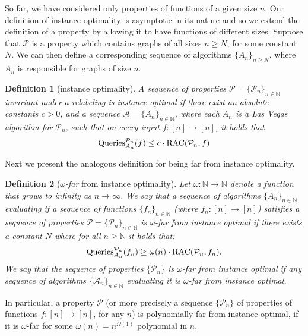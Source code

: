 \documentclass[11pt]{article}
\numberwithin{equation}{section}
\newtheorem{definition}[definition]{Definition}
\newcommand{\Query}{\text{Queries}}
\newcommand{\N}{\mathbb N}
\renewcommand{\P}{\mathcal{P}}
\newcommand{\1}{\mathbf{1}}
\newcommand{\A}{\mathcal A}
\begin{document}
So far, we have considered only properties of functions of a given size $n$. Our definition of instance optimality is asymptotic in its nature and so we extend the definition of a property by allowing it to have functions of different sizes. Suppose that  $\mathcal{P}$ is a property which contains graphs of all sizes $n \geq N$, for some constant $N$. 
We can then define a corresponding sequence of algorithms $\{A_n\}_{n \geq N}$, where $A_n$ is responsible for graphs of size $n$.
\begin{definition}[instance optimality]
  A sequence of properties $\P=\{\P_n\}_{n\in \N}$ invariant under a relabeling is \emph{instance optimal} if there exist an absolute constants $c > 0$,
  and a sequence
  $\A = \{A_n\}_{n\in \N}$, where each $A_n$ is a Las Vegas algorithm for $\mathcal{P}_n$, such that on every input $f \colon [n] \to [n]$, it holds that
  \begin{align*}
    \Query^{\P_n}_{A_n}(f) \leq c \cdot \RACC(\mathcal{P}_n,f)
  \end{align*}
\end{definition}
\iffalse
\begin{definition}[Instance Optimality]
 We say that a sequence of algorithms $\{A\}_{n \in \N}$ evaluating if a sequence of function $\{f\}_{n \in \N}$ satisfies a property $P$ is \emph{Instance Optimal} if there exists a universal constant, $c$, such that for any function $f$, it holds that:

  \begin{align*}
   \Query^{\P_n}_A(f) \le c \cdot \RACC(\P,f)
  \end{align*}
  We say that the property $\P$ is instance optimal if there exists an instance optimal algorithm for $\P$. Similarly we say that property $\P$ is not instance optimal if there is no instance Optimal algorithm for evaluating $\P$.
\end{definition}
\fi
Next we present the analogous definition for being far from instance optimality.
\begin{definition}[\emph{$\omega$-far} from instance optimality]
Let $\omega\colon \N \to \N$ denote a function that grows to infinity as $n \to \infty$.
We say that a sequence of algorithms $\{A_n\}_{n \in \N}$ evaluating if a sequence of functions $\{f_n\}_{n \in \N}$ (where $f_n \colon [n] \to [n]$) satisfies a sequence of properties $\P = \{\P_n\}_{n \in \N}$ is \emph{$\omega$-far from instance optimal} if there exists a constant $N$ where for all $n \ge \N$ it holds that:
  \begin{align*}
   \Query^{\P_n}_{A_n}(f_n) \ge \omega(n) \cdot \RACC(\P_n,f_n).
  \end{align*}
  We say that the sequence of properties $\{\P_n\}$ is \emph{$\omega$-far from instance optimal} if any sequence of algorithms $\{\A_n\}_{n \in \N}$ evaluating it is $\omega$-far from instance optimal.
\end{definition}
In particular, a property $\P$ (or more precisely a sequence $\{\P_n\}$ of properties of functions $f \colon [n] \to [n]$, for any $n$) is polynomially far from instance optimal, if it is $\omega$-far for some $\omega(n) = n^{\Omega(1)}$ polynomial in $n$. 
\end{document}
